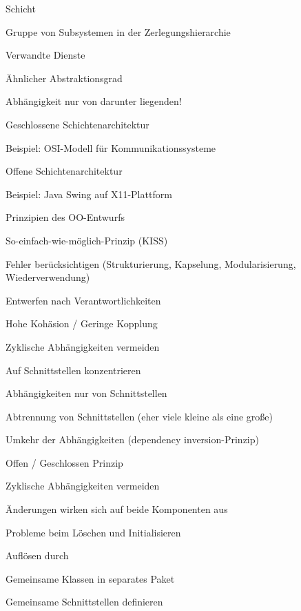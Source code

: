\documentclass[a4paper]{article}
\begin{document}
\begin{multicols}{3}
  Schicht
  \begin{itemize*}
    \item Gruppe von Subsystemen in der Zerlegungshierarchie
    \item Verwandte Dienste
    \item Ähnlicher Abstraktionsgrad
    \item Abhängigkeit nur von darunter liegenden!
  \end{itemize*}

  \begin{itemize*}
    \item Geschlossene Schichtenarchitektur
          \begin{itemize*}
            \item Beispiel: OSI-Modell für Kommunikationssysteme
          \end{itemize*}
    \item Offene Schichtenarchitektur
          \begin{itemize*}
            \item Beispiel: Java Swing auf X11-Plattform
          \end{itemize*}
  \end{itemize*}

  Prinzipien des OO-Entwurfs
  \begin{itemize*}
    \item So-einfach-wie-möglich-Prinzip (KISS)
    \item Fehler berücksichtigen (Strukturierung, Kapselung, Modularisierung, Wiederverwendung)
    \item Entwerfen nach Verantwortlichkeiten
    \item Hohe Kohäsion / Geringe Kopplung
    \item Zyklische Abhängigkeiten vermeiden
    \item Auf Schnittstellen konzentrieren
          \begin{itemize*}
            \item Abhängigkeiten nur von Schnittstellen
            \item Abtrennung von Schnittstellen (eher viele kleine als eine große)
            \item Umkehr der Abhängigkeiten (dependency inversion-Prinzip)
          \end{itemize*}
    \item Offen / Geschlossen Prinzip
  \end{itemize*}

  Zyklische Abhängigkeiten vermeiden
  \begin{itemize*}
    \item Änderungen wirken sich auf beide Komponenten aus
    \item Probleme beim Löschen und Initialisieren
    \item Auflösen durch
          \begin{itemize*}
            \item Gemeinsame Klassen in separates Paket
            \item Gemeinsame Schnittstellen definieren
          \end{itemize*}
  \end{itemize*}


\end{multicols}
\end{document}
